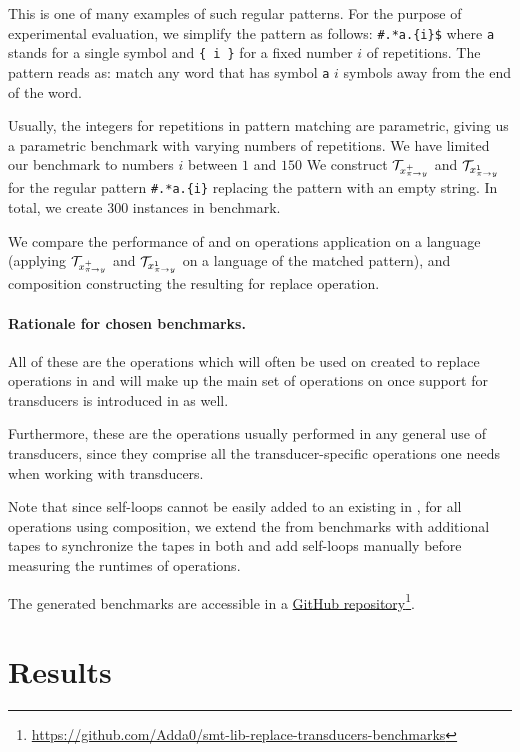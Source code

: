 This is one of many examples of such regular patterns.
For the purpose of experimental evaluation, we simplify the pattern as follows: \texttt{\#.*a.\{i\}\$} where \texttt{a} stands for a single symbol and \texttt{\{ i \}} for a fixed number $i$ of repetitions.
The pattern reads as: match any word that has symbol \texttt{a} $i$ symbols away from the end of the word.

Usually, the integers for repetitions in pattern matching are parametric, giving us a parametric benchmark \symbolFromEnd with varying numbers of repetitions.
We have limited our benchmark to numbers $i$ between $1$ and $150$
We construct $\mathcal{T}_{x^{+}_{\pi \rightarrow y}}$ and $\mathcal{T}_{x^{1}_{\pi \rightarrow y}}$ for the regular pattern \texttt{\#.*a.\{i\}} replacing the pattern with an empty string.
In total, we create $300$ instances in \symbolFromEnd benchmark.

We compare the performance of \mata and \mona on operations application on a language (applying $\mathcal{T}_{x^{+}_{\pi \rightarrow y}}$ and $\mathcal{T}_{x^{1}_{\pi \rightarrow y}}$ on a language of the matched pattern), and composition constructing the resulting \nft for replace operation.

\paragraph{Rationale for chosen benchmarks.}
All of these are the operations which will often be used on \nfts created to replace operations in \noodler and will make up the main set of operations on \nfts once support for transducers is introduced in \noodler as well.

Furthermore, these are the operations usually performed in any general use of transducers, since they comprise all the transducer-specific operations one needs when working with transducers.

Note that since self-loops cannot be easily added to an existing \nft in \mona, for all operations using composition, we extend the \nfts from benchmarks with additional tapes to synchronize the tapes in both \nfts and add self-loops manually before measuring the runtimes of operations.

The generated benchmarks are accessible in a \href{https://github.com/Adda0/smt-lib-replace-transducers-benchmarks}{GitHub repository}\footnote{\url{
https://github.com/Adda0/smt-lib-replace-transducers-benchmarks}}.

\section{Results}

